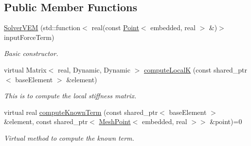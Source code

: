 \subsection*{\-Public \-Member \-Functions}
\begin{DoxyCompactItemize}
\item 
\hyperlink{class_solver_v_e_m_ae0eca27b7af4c0877c0abe2cfbcfdcae}{\-Solver\-V\-E\-M} (std\-::function$<$ real(const \hyperlink{class_point}{\-Point}$<$ embedded, real $>$ \&)$>$ input\-Force\-Term)
\begin{DoxyCompactList}\small\item\em \-Basic constructor. \end{DoxyCompactList}\item 
\hypertarget{class_solver_v_e_m_acdbd3c97184fbd831b2f21e28148c33e}{virtual \-Matrix$<$ real, \-Dynamic, \*
\-Dynamic $>$ \hyperlink{class_solver_v_e_m_acdbd3c97184fbd831b2f21e28148c33e}{compute\-Local\-K} (const shared\-\_\-ptr$<$ base\-Element $>$ \&element)}\label{class_solver_v_e_m_acdbd3c97184fbd831b2f21e28148c33e}

\begin{DoxyCompactList}\small\item\em \-This is to compute the local stiffness matrix. \end{DoxyCompactList}\item 
\hypertarget{class_solver_v_e_m_af5b39e79f497fb28f63592c44120d5fe}{virtual real \hyperlink{class_solver_v_e_m_af5b39e79f497fb28f63592c44120d5fe}{compute\-Known\-Term} (const shared\-\_\-ptr$<$ base\-Element $>$ \&element, const shared\-\_\-ptr$<$ \hyperlink{class_mesh_point}{\-Mesh\-Point}$<$ embedded, real $>$$>$ \&point)=0}\label{class_solver_v_e_m_af5b39e79f497fb28f63592c44120d5fe}

\begin{DoxyCompactList}\small\item\em \-Virtual method to compute the known term. \end{DoxyCompactList}\end{DoxyCompactItemize}
